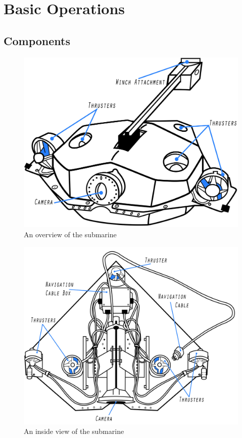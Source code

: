 \documentclass[
10pt, %
a4paper, %
oneside, %
headinclude,footinclude, %
BCOR5mm, %
]{scrartcl}
\begin{document}
\newpage
 

\section{Basic Operations}
\subsection{Components}
\begin{figure}[H]
	\centering 
	\includegraphics[width=0.9\linewidth]{Figures/Component_Diagrams/basic_sub.jpg}
	\caption[]{An overview of the submarine} %
\end{figure}
\begin{figure}[H]
	\centering 
	\includegraphics[width=0.9\columnwidth]{Figures/Component_Diagrams/inside_sub.jpg}
	\caption[]{An inside view of the submarine} %
\end{figure}
\end{document}
